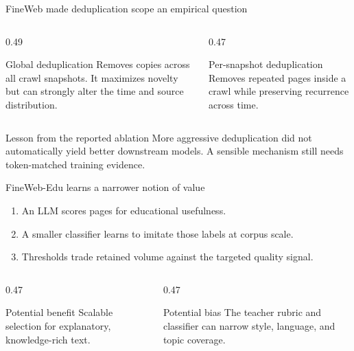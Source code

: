 \documentclass[handout]{beamer}
\begin{document}
\begin{frame}{FineWeb made deduplication scope an empirical question}
  \begin{columns}[c]
    \begin{column}{0.49\linewidth}
      \begin{block}{Global deduplication}
        Removes copies across all crawl snapshots. It maximizes novelty but can strongly alter the time and source distribution.
      \end{block}
    \end{column}
    \begin{column}{0.47\linewidth}
      \begin{block}{Per-snapshot deduplication}
        Removes repeated pages inside a crawl while preserving recurrence across time.
      \end{block}
    \end{column}
  \end{columns}
  \begin{alertblock}{Lesson from the reported ablation}
    More aggressive deduplication did not automatically yield better downstream models. A sensible mechanism still needs token-matched training evidence.
  \end{alertblock}
\end{frame}

\begin{frame}{FineWeb-Edu learns a narrower notion of value}
  \begin{enumerate}
    \setlength{\itemsep}{7pt}
    \item An LLM scores pages for educational usefulness.
    \item A smaller classifier learns to imitate those labels at corpus scale.
    \item Thresholds trade retained volume against the targeted quality signal.
  \end{enumerate}
  \begin{columns}[t]
    \begin{column}{0.47\linewidth}
      \begin{block}{Potential benefit}
        Scalable selection for explanatory, knowledge-rich text.
      \end{block}
    \end{column}
    \begin{column}{0.47\linewidth}
      \begin{alertblock}{Potential bias}
        The teacher rubric and classifier can narrow style, language, and topic coverage.
      \end{alertblock}
    \end{column}
  \end{columns}
\end{frame}
\end{document}
